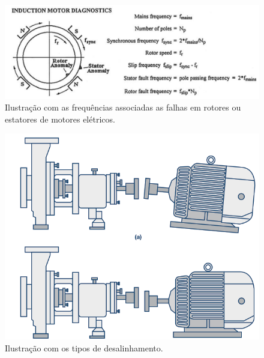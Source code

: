 \begin{figure}[H]
    \caption{Ilustração com as frequências associadas as falhas em rotores ou estatores de motores elétricos.}
    \begin{center}
        \includegraphics[scale=.35]{referencial/img/fault_freq_randall_p55.png}
    \end{center}
    \label{fig:}
\end{figure}


\begin{figure}[H]
    \caption{Ilustração com os tipos de desalinhamento.}
    \begin{center}
        \includegraphics[scale=.45]{referencial/img/misadraw_analog_p2.png}
    \end{center}
    \label{fig:}
\end{figure}


